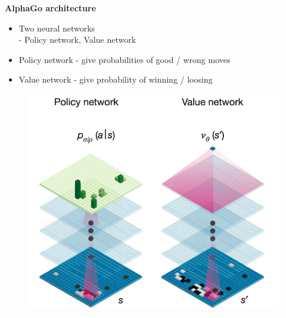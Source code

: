 \documentclass[xcolor=dvipsnames]{beamer}
\begin{document}
\begin{frame}{\bf AlphaGo architecture}


\begin{itemize}
    \item Two neural networks \\
    - Policy network, Value network
    \item Policy network - give probabilities of good / wrong moves
    \item Value network - give probability of winning / loosing
\end{itemize}

\begin{figure}[!htb]
  \centering
  \includegraphics[scale=0.2]{../../pictures/alpha_go_architecture.png}
\end{figure}

\end{frame}
\end{document}
